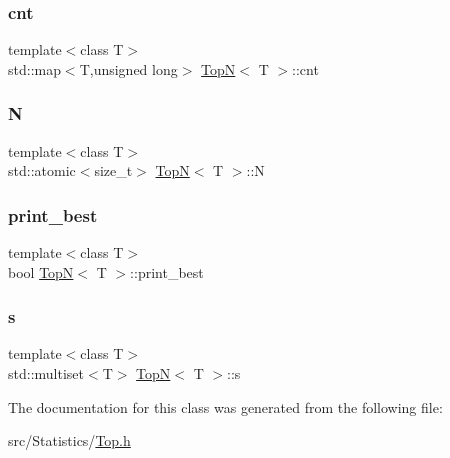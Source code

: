 \subsubsection{\texorpdfstring{cnt}{cnt}}
{\footnotesize\ttfamily template$<$class T$>$ \\
std\+::map$<$T,unsigned long$>$ \hyperlink{class_top_n}{TopN}$<$ T $>$\+::cnt}

\mbox{\label{class_top_n_a1a4f701ca7296acfadcb6d0511247fcf}} 
\subsubsection{\texorpdfstring{N}{N}}
{\footnotesize\ttfamily template$<$class T$>$ \\
std\+::atomic$<$size\+\_\+t$>$ \hyperlink{class_top_n}{TopN}$<$ T $>$\+::N}

\mbox{\label{class_top_n_a90472852f225e5b851446e4b7ced4856}} 
\subsubsection{\texorpdfstring{print\+\_\+best}{print\_best}}
{\footnotesize\ttfamily template$<$class T$>$ \\
bool \hyperlink{class_top_n}{TopN}$<$ T $>$\+::print\+\_\+best}

\mbox{\label{class_top_n_a1fea03a721d2485b03cc38834775c924}} 
\subsubsection{\texorpdfstring{s}{s}}
{\footnotesize\ttfamily template$<$class T$>$ \\
std\+::multiset$<$T$>$ \hyperlink{class_top_n}{TopN}$<$ T $>$\+::s}



The documentation for this class was generated from the following file\+:\begin{DoxyCompactItemize}
\item 
src/\+Statistics/\hyperlink{_top_8h}{Top.\+h}\end{DoxyCompactItemize}
